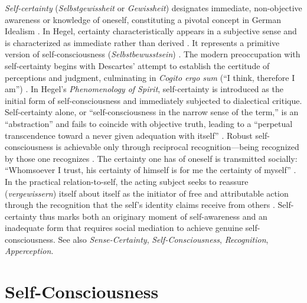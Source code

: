 \documentclass{book}
\begin{document}
\textit{Self-certainty} (\textit{Selbstgewissheit} or \textit{Gewissheit}) designates immediate, non-objective awareness or knowledge of oneself, constituting a pivotal concept in German Idealism \parencite{inwood1992hegel, caygill_kant_2004, Carspecken:2006aa}. In Hegel, certainty characteristically appears in a subjective sense and is characterized as immediate rather than derived \parencite{inwood1992hegel}. It represents a primitive version of self-consciousness (\textit{Selbstbewusstsein}) \parencite{inwood1992hegel}. The modern preoccupation with self-certainty begins with Descartes' attempt to establish the certitude of perceptions and judgment, culminating in \textit{Cogito ergo sum} (``I think, therefore I am'') \parencite{caygill_kant_2004, Descartes1996Meditations}. In Hegel's \textit{Phenomenology of Spirit}, self-certainty is introduced as the initial form of self-consciousness and immediately subjected to dialectical critique. Self-certainty alone, or ``self-consciousness in the narrow sense of the term,'' is an ``abstraction'' and fails to coincide with objective truth, leading to a ``perpetual transcendence toward a never given adequation with itself'' \parencite[204]{Hyppolite1974}. Robust self-consciousness is achievable only through reciprocal recognition---being recognized by those one recognizes \parencite[49]{Brandom:2019aa}. The certainty one has of oneself is transmitted socially: ``Whomsoever I trust, his certainty of himself is for me the certainty of myself'' \parencite{Brandom:2019aa}. In the practical relation-to-self, the acting subject seeks to reassure (\textit{vergewissern}) itself about itself as the initiator of free and attributable action through the recognition that the self's identity claims receive from others \parencite{habermas1992individuation, habermas_postmetaphysical_2017}. Self-certainty thus marks both an originary moment of self-awareness and an inadequate form that requires social mediation to achieve genuine self-consciousness. See also \textit{Sense-Certainty}, \textit{Self-Consciousness}, \textit{Recognition}, \textit{Apperception}.

\section{Self-Consciousness}
\end{document}
